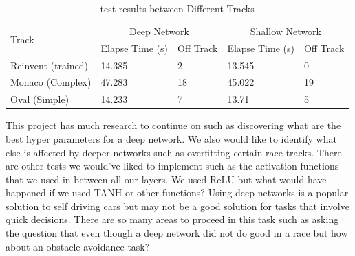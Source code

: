 \documentclass[journal]{IEEEtran}
\begin{document}
\begin{table}[t]
\centering
\caption{test results between Different Tracks}
\begin{tabular}{ |p{2cm}|p{1.25cm}|p{1cm}|p{1.25cm}|p{1cm}| }
\hline
 \multirow{2}{4em}{Track} & \multicolumn{2}{|c|}{Deep Network} & \multicolumn{2}{|c|}{Shallow Network} \\
\cline{2-5}
 & Elapse Time (s) & Off Track &  Elapse Time (s) & Off Track  \\
\hline
Reinvent (trained) & 14.385	 & 2 & 13.545	 & 0 \\ 
 \hline
Monaco (Complex) & 47.283	 & 18 & 45.022	& 19 \\ 
 \hline
Oval (Simple) & 14.233	 & 7 & 13.71 & 5 \\ 
 \hline
\end{tabular}
\label{DiffRacetrackTest}
\end{table}


This project has much research to continue on such as discovering what are the best hyper parameters for a deep network.  We also would like to identify what else is affected by deeper networks such as overfitting certain race tracks.  There are other tests we would've liked to implement such as the activation functions that we used in between all our layers.  We used ReLU but what would have happened if we used TANH or other functions?  Using deep networks is a popular solution to self driving cars but may not be a good solution for tasks that involve quick decisions.  There are so many areas to proceed in this task such as asking the question that even though a deep network did not do good in a race but how about an obstacle avoidance task?
\end{document}
